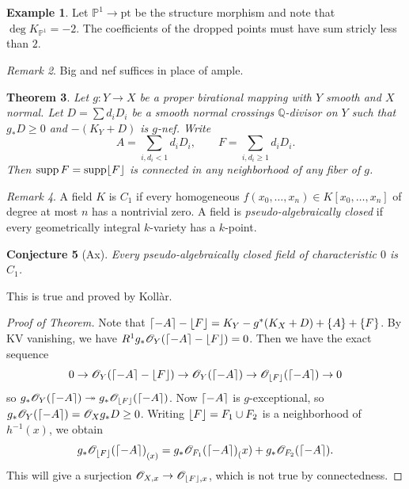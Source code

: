 \documentclass[leqno, openany]{memoir}
\DeclarePairedDelimiter{\floor}{\lfloor}{\rfloor}
\DeclarePairedDelimiter{\ceil}{\lceil}{\rceil}
\newtheorem{thm}{Theorem}[section]
\newtheorem{conj}[thm]{Conjecture}
\theoremstyle{definition}
\newtheorem{exm}[thm]{Example}
\theoremstyle{remark}
\newtheorem{rmk}[thm]{Remark}
\theoremstyle{plain}
\theoremstyle{definition}
\theoremstyle{remark}
\newcommand{\Q}{\mathbb{Q}}
\renewcommand{\P}{\mathbb{P}}
\newcommand{\msc}[1]{\mathscr{#1}}
\newcommand{\mr}[1]{\mathrm{#1}}
\DeclareMathOperator{\supp}{supp}
\begin{document}
\begin{exm}
    Let $\P^1 \to \mr{pt}$ be the structure morphism and note that $\deg K_{\P^1} = -2$. The coefficients of the dropped points must have sum stricly less than $2$.
\end{exm}

\begin{rmk}
    Big and nef suffices in place of ample.
\end{rmk}

\begin{thm}
    Let $g \colon Y \to X$ be a proper birational mapping with $Y$ smooth and $X$ normal. Let $D = \sum d_i D_i$ be a smooth normal crossings $\Q$-divisor on $Y$ such that $g_* D \geq 0$ and $-(K_Y + D)$ is $g$-nef. Write
    \[ A = \sum_{i, d_i < 1} d_i D_i, \qquad F = \sum_{i, d_i \geq 1} d_i D_i. \]
    Then $\supp F = \supp \floor{F}$ is connected in any neighborhood of any fiber of $g$.
\end{thm}

\begin{rmk}
    A field $K$ is $C_1$ if every homogeneous $f(x_0, \ldots, x_n) \in K[x_0, \ldots, x_n]$ of degree at most $n$ has a nontrivial zero. A field is \textit{pseudo-algebraically closed} if every geometrically integral $k$-variety has a $k$-point.
\end{rmk}

\begin{conj}[Ax]
    Every pseudo-algebraically closed field of characteristic $0$ is $C_1$.
\end{conj}

This is true and proved by Koll\`ar.

\begin{proof}[Proof of Theorem]
    Note that $\ceil{-A} - \floor{F} = K_Y - g^*(K_X + D) + \qty{A} + \qty{F}$. By KV vanishing, we have $R^1 g_* \msc{O}_Y(\ceil{-A} - \floor{F}) = 0$. Then we have the exact sequence
    \[ 0 \to \msc{O}_Y(\ceil{-A} - \floor{F}) \to \msc{O}_Y(\ceil{-A}) \to \msc{O}_{\floor{F}}(\ceil{-A}) \to 0 \]
    so $g_* \msc{ O }_Y(\ceil{-A}) \twoheadrightarrow g_* \msc{O}_{\floor{F}}(\ceil{-A})$. Now $\ceil{-A}$ is $g$-exceptional, so $g_* \msc{O}_Y(\ceil{-A}) = \msc{O}_X g_* D \geq 0$. Writing $\floor{F} = F_1 \cup F_2$ is a neighborhood of $h^{-1}(x)$, we obtain
    \[ { g_* \msc{O}_{\floor{F}}(\ceil{-A}) }_{(x)} = { g_* \msc{O}_{F_1} (\ceil{-A}) }_(x) + g_* \msc{O}_{F_2}(\ceil{-A}). \]
    This will give a surjection $\msc{O}_{X, x} \to \msc{O}_{\floor{F}, x}$, which is not true by connectedness.
\end{proof}
\end{document}
